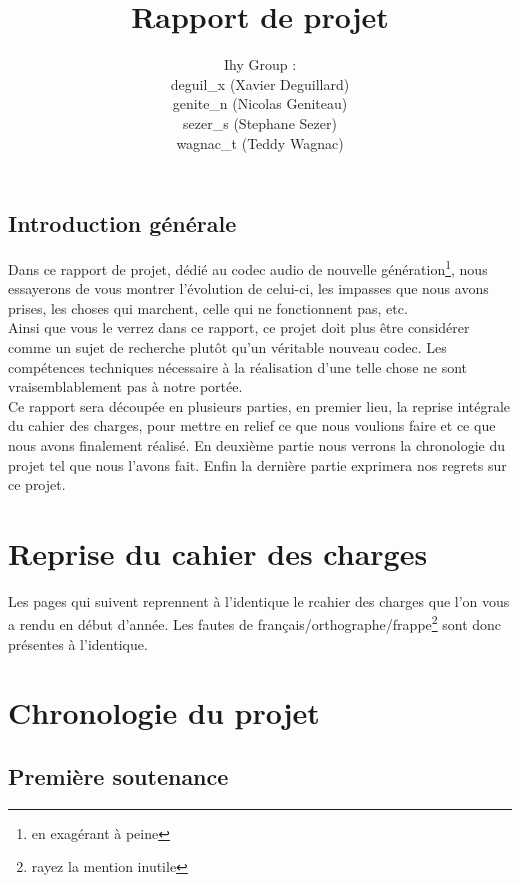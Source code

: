 \documentclass[a4paper,12pt]{report}
\title{Rapport de projet}
\author{
Ihy Group : \\
deguil\_x (Xavier Deguillard)\\
genite\_n (Nicolas Geniteau)\\
sezer\_s (Stephane Sezer)\\
wagnac\_t (Teddy Wagnac)
}
\begin{document}
\maketitle

\section*{Introduction générale}
Dans ce rapport de projet, dédié au codec audio de nouvelle
génération\footnote{en exagérant à peine}, nous essayerons de vous montrer
l'évolution de celui-ci, les impasses que nous avons prises, les choses qui
marchent, celle qui ne fonctionnent pas, etc.\\
Ainsi que vous le verrez dans ce rapport, ce projet doit plus être considérer
comme un sujet de recherche plutôt qu'un véritable nouveau codec. Les
compétences techniques nécessaire à la réalisation d'une telle chose ne sont
vraisemblablement pas à notre portée.\\
Ce rapport sera découpée en plusieurs parties, en premier lieu, la reprise
intégrale du cahier des charges, pour mettre en relief ce que nous voulions
faire et ce que nous avons finalement réalisé. En deuxième partie nous verrons
la chronologie du projet tel que nous l'avons fait. Enfin la dernière partie
exprimera nos regrets sur ce projet.

\tableofcontents

\chapter{Reprise du cahier des charges}
Les pages qui suivent reprennent à l'identique le rcahier des charges que l'on
vous a rendu en début d'année. Les fautes de
français/orthographe/frappe\footnote{rayez la mention inutile} sont
donc présentes à l'identique.


\chapter{Chronologie du projet}
\section{Première soutenance}
\end{document}
